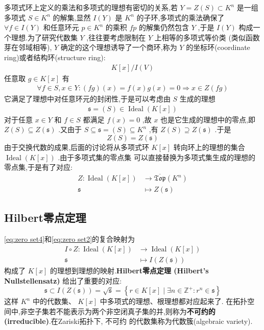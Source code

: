 多项式环上定义的乘法和多项式的理想有密切的关系,若 $Y=Z(S) \subset K^n$ 是一组多项式 $S \in K^n$ 的解集,显然 $I(Y)$ 是 $K^n$ 的子环,多项式的乘法确保了 $\forall f \in I(Y)$ 和任意环元 $p \in K^n$ 的乘积 $f p$ 的解集仍然包含 $Y$ ,于是 $I(Y)$ 构成一个理想.为了研究代数集 $Y$ ,往往要考虑限制在 $Y$ 上相等的多项式等价类 (类似函数芽在邻域相等), $Y$ 确定的这个理想诱导了一个商环,称为 $Y$ 的坐标环(coordinate ring)或者结构环(structure ring):
\begin{align*}
K[x] / I(V)
\end{align*}
任意取 $g \in K[x]$ 有
\begin{align*}
\forall f \in S, x \in Y:(f g)(x)=f(x) g(x)=0 \Rightarrow x \in Z(f g)
\end{align*}
它满足了理想中对任意环元的封闭性,于是可以考虑由 $S$ 生成的理想
\begin{align*}
\mathfrak{s}=(S) \in \operatorname{Ideal}(K[x])
\end{align*}
对于任意 $x \in Y$ 和 $f \in S$ 都满足 $f(x)=0$ ,故 $x$ 也是它生成的理想中的零点,即 $Z(S) \subseteq Z(\mathfrak{s})$ .又由于 $S \subseteq \mathfrak{s}=(S) \subseteq K^n$ ,有 $Z(S) \supseteq Z(\mathfrak{s})$ .于是
\begin{equation}\label{eq:zero set3}
Z(S)=Z(\mathfrak{s})
\end{equation}
由于交换代数的成果,后面的讨论将从多项式环 $K[x]$ 转向环上的理想的集合 $\operatorname{Ideal}(K[x])$ .由于多项式集的零点集 可以直接替换为多项式集生成的理想的零点集,于是有了对应:
\begin{equation}\label{eq:zero set4}
\begin{aligned}
Z: \operatorname{Ideal}(K[x]) & \rightarrow \overline{\mathfrak{T} \mathfrak{o p}}\left(K^n\right) \\
\mathfrak{s} & \mapsto Z(\mathfrak{s})
\end{aligned}
\end{equation}
\subsection{Hilbert零点定理}
\eqref{eq:zero set4}和\eqref{eq:zero set2}的复合映射为
\begin{equation}\label{eq:zero set5}
  \begin{aligned}
  I \circ Z: \operatorname{Ideal}(K[x]) & \rightarrow \operatorname{Ideal}(K[x]) \\
  \mathfrak{s} & \mapsto I(Z(\mathfrak{s}))
  \end{aligned}
  \end{equation}
  构成了 $K[x]$ 的理想到理想的映射.\textbf{Hilbert零点定理 (Hilbert's Nullstellensatz)} 给出了重要的对应:
  \begin{equation}\label{eq:zero set6}
  \mathfrak{s} \subset I(Z(\mathfrak{s}))=\sqrt{\mathfrak{s}}=\left\{r \in K[x] \mid \exists n \in \mathbb{Z}^{+}: r^n \in \mathfrak{s}\right\}
  \end{equation}
  这样 $K^n$ 中的代数集、 $K[x]$ 中多项式的理想、根理想都对应起来了.
  在拓扑空间中,非空子集若不能表示为两个非空闭真子集的并,则称为\textbf{不可约的 (irreducible)}.在Zariski拓扑下, 不可约 的代数集称为代数簇(algebraic variety).\cite{hartshorne2013algebraic}

